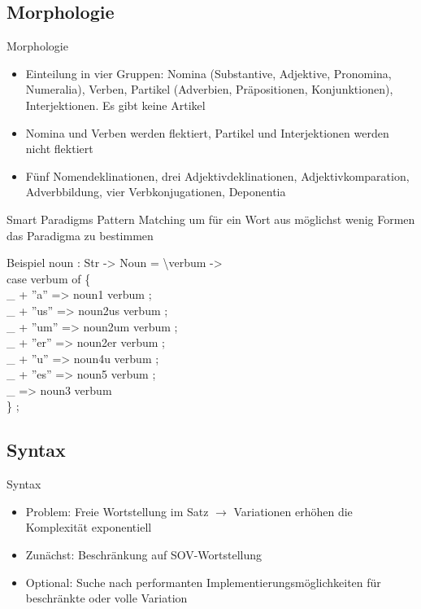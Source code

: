 \documentclass{beamer}
\begin{document}
\subsection{Morphologie}
\begin{frame}{Morphologie}
\begin{itemize}
\item Einteilung in vier Gruppen: Nomina (Substantive, Adjektive, Pronomina, Numeralia), Verben, Partikel (Adverbien, Präpositionen, Konjunktionen), Interjektionen. Es gibt keine Artikel
\item Nomina und Verben werden flektiert, Partikel und Interjektionen werden nicht flektiert
\item Fünf Nomendeklinationen, drei Adjektivdeklinationen, Adjektivkomparation, Adverbbildung, vier Verbkonjugationen, Deponentia
\end{itemize}
\end{frame}
\begin{frame}{Smart Paradigms}
Pattern Matching um für ein Wort aus möglichst wenig Formen das Paradigma zu bestimmen
\begin{block}{Beispiel}
{\scriptsize\ttfamily
  noun : Str -> Noun = \textbackslash verbum ->  \\
    case verbum of \{ \\
      \_ + ''a''  => noun1 verbum ; \\
      \_ + ''us'' => noun2us verbum ; \\
      \_ + ''um'' => noun2um verbum ; \\
      \_ + ''er'' => noun2er verbum ;  \\
      \_ + ''u''  => noun4u verbum ;  \\
      \_ + ''es'' => noun5 verbum ;  \\
      \_  => noun3 verbum \\
      \} ; 
}
\end{block}
\end{frame}
\subsection{Syntax}
\begin{frame}{Syntax}
\begin{itemize}
\item Problem: Freie Wortstellung im Satz $\rightarrow$ Variationen erhöhen die Komplexität exponentiell
\item Zunächst: Beschränkung auf SOV-Wortstellung
\item Optional: Suche nach performanten Implementierungsmöglichkeiten für beschränkte oder volle Variation
\end{itemize}
\end{frame}
\end{document}
